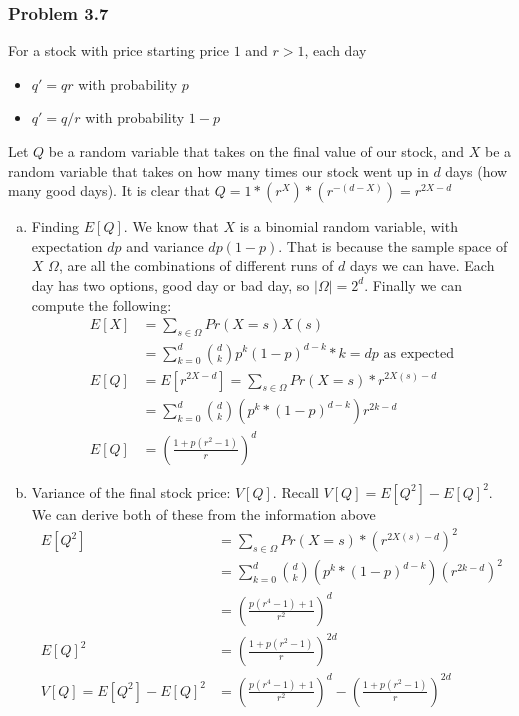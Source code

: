 \documentclass[12pt,letterpaper]{article}
\newenvironment{answer}[1]{
  \subsubsection*{Problem #1}
}{\newpage}
\begin{document}
\begin{answer}{3.7}
For a stock with price starting price $1$ and $r > 1$, each day
\begin{itemize}
    \item $q' = qr$ with probability $p$
    \item $q' = q/r$ with probability $1 - p$
\end{itemize}
Let $Q$ be a random variable that takes on the final value of our stock, and $X$ be a random variable that takes on how many times our stock went up in $d$ days (how many good days). It is clear that $Q = 1*(r^X)*(r^{-(d - X)}) = r^{2X - d}$
\begin{enumerate}[a.]
\item Finding $E[Q]$. We know that $X$ is a binomial random variable, with expectation $dp$ and variance $dp(1-p)$. That is because the sample space of $X$ $\Omega$, are all the combinations of different runs of $d$ days we can have. Each day has two options, good day or bad day, so $|\Omega| = 2^d$.
Finally we can compute the following:
    \begin{align*}
        E[X] &= \sum_{s\in \Omega} Pr(X = s) X(s) \\
            &= \sum_{k = 0}^d {d \choose k}p^k (1 - p)^{d - k} * k = dp \text{ as expected}\\
        E[Q] &= E[r^{2X - d}] = \sum_{s\in \Omega} Pr(X = s) * r^{2X(s) - d}\\
            &= \sum_{k = 0}^d {d \choose k}\left( p^k * (1 - p)^{d - k} \right) r^{2k - d}\\
        E[Q] &= \left(\frac{ 1 + p(r^2 - 1) }{ r }\right)^d
    \end{align*}

\item Variance of the final stock price: $V[Q]$. Recall $V[Q] = E[Q^2] - E[Q]^2$. We can derive both of these from the information above
    \begin{align*}
    E[Q^2] &= \sum_{s \in \Omega} Pr(X = s) * (r^{2X(s) - d})^2 \\
        &= \sum_{k=0}^d {d \choose k}\left( p^k * (1 - p)^{d - k} \right) \left(r^{2k - d}\right)^2\\
        &= \left(\frac{p(r^4 - 1) + 1}{r^2}\right)^d\\
    E[Q]^2 &= \left(\frac{ 1 + p(r^2 - 1) }{ r }\right)^{2d}\\
    V[Q] = E[Q^2] - E[Q]^2 &= \left(\frac{p(r^4 - 1) + 1}{r^2}\right)^d - \left(\frac{ 1 + p(r^2 - 1) }{ r }\right)^{2d}
    \end{align*}
\end{enumerate}
\end{answer}
\end{document}
